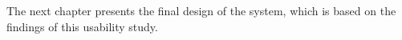 The next chapter presents the final design of the system, which is based on the findings of this usability study.








